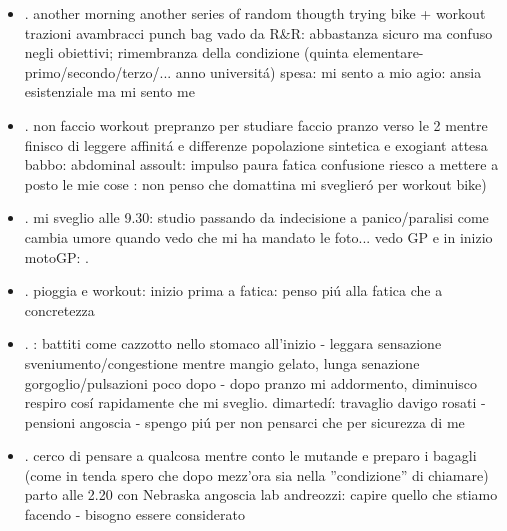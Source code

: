 \begin{itemize}
confusione loquor (gi\'u al mercato, quando ci sono gli arrivi nuovi) senso di smarrimento a girare ikea 
workout passivo all'inizio
workout abitudine concentrazione: leggo mentre guardo film?
Mi addormento su divano con le luci accese, e mi risveglio non riuscendo a spegerle e a lavarmi i denti 
\item {}.
another morning another series of random thougth
trying bike + workout trazioni avambracci punch bag
vado da R\&R: abbastanza sicuro ma confuso negli obiettivi; rimembranza della condizione  (quinta elementare-primo/secondo/terzo/... anno universit\'a)
spesa: mi sento a mio agio: ansia esistenziale ma mi sento me
\item {}.
non faccio workout prepranzo per studiare
faccio pranzo verso le 2 mentre finisco di leggere affinit\'a e differenze popolazione sintetica e exogiant
attesa babbo: 
abdominal assoult: impulso paura fatica confusione
riesco a mettere a posto le mie cose : non penso che domattina mi sveglier\'o per workout bike) 
\item {}.
mi sveglio alle 9.30: studio passando da indecisione a panico/paralisi
come cambia umore quando vedo che mi ha mandato le foto...
vedo GP e in inizio motoGP: .
\item {}.
pioggia e workout: inizio prima a fatica: penso pi\'u alla fatica che a concretezza
\item {}.
: battiti come cazzotto nello stomaco all'inizio - leggara sensazione sveniumento/congestione mentre mangio gelato, lunga senazione gorgoglio/pulsazioni poco dopo - dopo pranzo mi addormento, diminuisco respiro cos\'i rapidamente che mi sveglio.
dimarted\'i: travaglio davigo rosati - pensioni angoscia  - spengo pi\'u per non pensarci che per sicurezza di me
\item {}.
cerco di pensare a qualcosa mentre conto le mutande e preparo i bagagli (come in tenda spero che dopo mezz'ora sia nella ''condizione'' di chiamare)
parto alle 2.20 con Nebraska
angoscia lab andreozzi: capire quello che stiamo facendo - bisogno essere considerato

\end{itemize}
